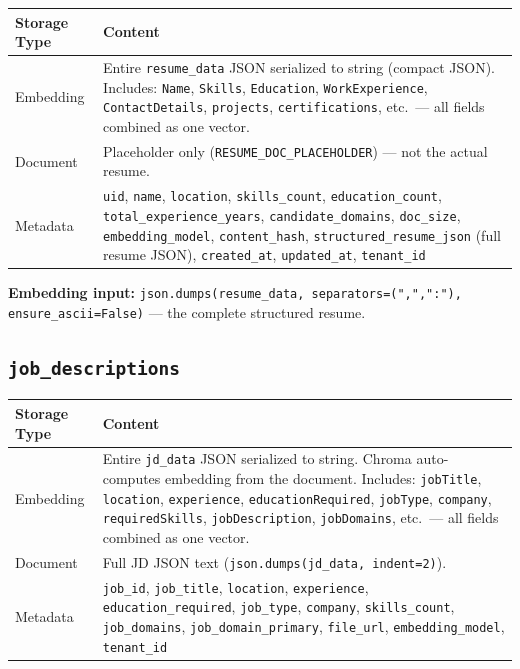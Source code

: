 \documentclass[11pt]{article}
\begin{document}
\begin{table}[h]
\centering
\begin{tabular}{@{}p{2.2cm}p{11cm}@{}}
\toprule
\textbf{Storage Type} & \textbf{Content} \\
\midrule
Embedding & Entire \texttt{resume\_data} JSON serialized to string (compact JSON). Includes: \texttt{Name}, \texttt{Skills}, \texttt{Education}, \texttt{WorkExperience}, \texttt{ContactDetails}, \texttt{projects}, \texttt{certifications}, etc.\ --- all fields combined as one vector. \\
\midrule
Document & Placeholder only (\texttt{RESUME\_DOC\_PLACEHOLDER}) --- not the actual resume. \\
\midrule
Metadata & \texttt{uid}, \texttt{name}, \texttt{location}, \texttt{skills\_count}, \texttt{education\_count}, \texttt{total\_experience\_years}, \texttt{candidate\_domains}, \texttt{doc\_size}, \texttt{embedding\_model}, \texttt{content\_hash}, \texttt{structured\_resume\_json} (full resume JSON), \texttt{created\_at}, \texttt{updated\_at}, \texttt{tenant\_id} \\
\bottomrule
\end{tabular}
\end{table}

\textbf{Embedding input:} \texttt{json.dumps(resume\_data, separators=(",",":"), ensure\_ascii=False)} --- the complete structured resume.

\subsection{\texttt{job\_descriptions}}

\begin{table}[h]
\centering
\begin{tabular}{@{}p{2.2cm}p{11cm}@{}}
\toprule
\textbf{Storage Type} & \textbf{Content} \\
\midrule
Embedding & Entire \texttt{jd\_data} JSON serialized to string. Chroma auto-computes embedding from the document. Includes: \texttt{jobTitle}, \texttt{location}, \texttt{experience}, \texttt{educationRequired}, \texttt{jobType}, \texttt{company}, \texttt{requiredSkills}, \texttt{jobDescription}, \texttt{jobDomains}, etc.\ --- all fields combined as one vector. \\
\midrule
Document & Full JD JSON text (\texttt{json.dumps(jd\_data, indent=2)}). \\
\midrule
Metadata & \texttt{job\_id}, \texttt{job\_title}, \texttt{location}, \texttt{experience}, \texttt{education\_required}, \texttt{job\_type}, \texttt{company}, \texttt{skills\_count}, \texttt{job\_domains}, \texttt{job\_domain\_primary}, \texttt{file\_url}, \texttt{embedding\_model}, \texttt{tenant\_id} \\
\bottomrule
\end{tabular}
\end{table}
\end{document}
